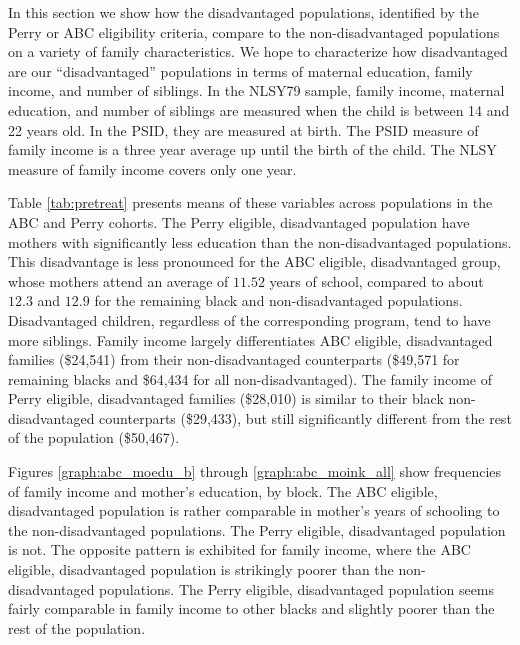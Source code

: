 In this section we show how the disadvantaged populations, identified by the Perry or ABC eligibility criteria, compare to the non-disadvantaged populations on a variety of family characteristics. We hope to characterize how disadvantaged are our ``disadvantaged'' populations in terms of maternal education, family income, and number of siblings. In the NLSY79 sample, family income, maternal education, and number of siblings are measured when the child is between 14 and 22 years old. In the PSID, they are measured at birth. The PSID measure of family income is a three year average up until the birth of the child. The NLSY measure of family income covers only one year. 

Table \ref{tab:pretreat}  presents means of these variables across populations in the ABC and Perry cohorts. The Perry eligible, disadvantaged population have mothers with significantly less education than the non-disadvantaged populations. This disadvantage is less pronounced for the ABC eligible, disadvantaged group, whose mothers attend an average of $11.52$ years of school, compared to about $12.3$ and $12.9$ for the remaining black and non-disadvantaged populations. Disadvantaged children, regardless of the corresponding program, tend to have more siblings. Family income largely differentiates ABC eligible, disadvantaged families (\$24,541) from their non-disadvantaged counterparts (\$49,571 for remaining blacks and \$64,434 for all non-disadvantaged). The family income of Perry eligible, disadvantaged families (\$28,010) is similar to their black non-disadvantaged counterparts (\$29,433), but still significantly different from the rest of the population (\$50,467). 

Figures \ref{graph:abc_moedu_b} through \ref{graph:abc_moink_all} show frequencies of family income and mother's education, by block. The ABC eligible, disadvantaged population is rather comparable in mother's years of schooling to the non-disadvantaged populations. The Perry eligible, disadvantaged population is not. The opposite pattern is exhibited for family income, where the ABC eligible, disadvantaged population is strikingly poorer than the non-disadvantaged populations. The Perry eligible, disadvantaged population seems fairly comparable in family income to other blacks and slightly poorer than the rest of the population. 

